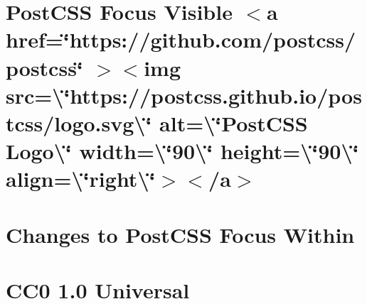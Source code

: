 \documentclass[twoside]{book}
\newcommand{\+}{\discretionary{\mbox{\scriptsize$\hookleftarrow$}}{}{}}
\begin{document}
\chapter{Post\+CSS Focus Visible \texorpdfstring{$<$}{<}a href=\char`\"{}https\+://github.\+com/postcss/postcss\char`\"{} \texorpdfstring{$>$}{>}\texorpdfstring{$<$}{<}img src=\textbackslash{}\char`\"{}https\+://postcss.\+github.\+io/postcss/logo.\+svg\textbackslash{}\char`\"{} alt=\textbackslash{}\char`\"{}\+Post\+CSS Logo\textbackslash{}\char`\"{} width=\textbackslash{}\char`\"{}90\textbackslash{}\char`\"{} height=\textbackslash{}\char`\"{}90\textbackslash{}\char`\"{} align=\textbackslash{}\char`\"{}right\textbackslash{}\char`\"{}\texorpdfstring{$>$}{>}\texorpdfstring{$<$}{<}/a\texorpdfstring{$>$}{>}}
\label{md__c___users_vaishnavi_jadhav__desktop__developer_code_mean_stack_example_client_node_modules_p3ac751b40284f94008698fe52f12a973}

\chapter{Changes to Post\+CSS Focus Within}
\label{md__c___users_vaishnavi_jadhav__desktop__developer_code_mean_stack_example_client_node_modules_pb6b6c7b15066d6daadf887dfe8fd7002}

\chapter{CC0 1.0 Universal}
\label{md__c___users_vaishnavi_jadhav__desktop__developer_code_mean_stack_example_client_node_modules_pf299a5f2793c1a0d60a75103d40be2d4}

\end{document}
